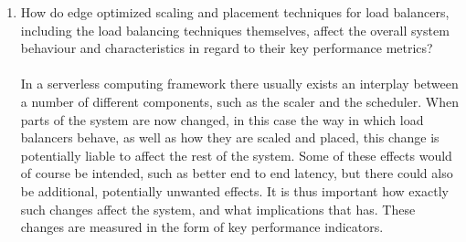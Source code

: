 \begin{enumerate}
        \item How do edge optimized scaling and placement techniques for load balancers, including the load balancing techniques themselves, affect the overall system behaviour and characteristics in regard to their key performance metrics?\\\\
    In a serverless computing framework there usually exists an interplay between a number of different components, such as the scaler and the scheduler\cite{openfaas}\cite{kubernetes}. 
    When parts of the system are now changed, in this case the way in which load balancers behave, as well as how they are scaled and placed, this change is potentially liable to affect the rest of the system. Some of these effects would of course be intended, such as better end to end latency, but there could also be additional, potentially unwanted effects. It is thus important how exactly such changes affect the system, and what implications that has. These changes are measured in the form of key performance indicators.
    
\end{enumerate}
